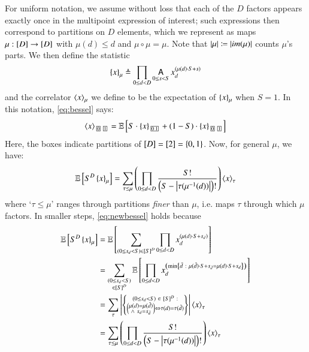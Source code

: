         For uniform notation, we assume without loss that each of the $D$
        factors appears exactly once in the multipoint expression of interest;
        such expressions then correspond to partitions on $D$ elements, which
        we represent as maps $\mu:\left[D\right]\to \left[D\right]$ with $\mu(d)\leq d$ and
        $\mu\circ \mu=\mu$.  Note that $\left|\mu\right| \coloneqq \left|im(\mu)\right|$
        counts $\mu$'s parts.  We then define the statistic
        $$
            \left\{x\right\}_\mu
            \triangleq
            \prod_{0\leq d<D} \operatorname*{\text{\sffamily A}}_{0\leq s<S} x_d^{(\mu(d)\cdot S + s)}
        $$
        and the correlator $\left\langle x\right\rangle_\mu$ we define to be the expectation of 
        $\left\{x\right\}_\mu$ when $S=1$.  In this notation, \ref{eq:bessel} says: 
        $$
            \wang{x}_{\partitionbox{0}\partitionbox{1}}
            =
            \expct{
                S       \cdot \wurl{x}_{\partitionbox{0 1}} +
                (1-S)   \cdot \wurl{x}_{\partitionbox{0}\partitionbox{1}}
            }
        $$
        Here, the boxes indicate partitions of $\left[D\right]=\left[2\right]=\{0,1\}$.
        Now, for general $\mu$, we have:
        \begin{equation} \label{eq:newbessel}
            \mathbb{E}\left[S^D \left\{x\right\}_\mu\right]
            =
            \sum_{\tau\leq \mu} \left(
                \prod_{0\leq d<D}
                    \frac{S!}{\left(S-\left|\tau(\mu^{-1}(d))\right|\right)!}
            \right)
            \left\langle x\right\rangle_\tau
        \end{equation}
        where `$\tau \leq \mu$' ranges through partitions \emph{finer} than 
        $\mu$, i.e. maps $\tau$ through which $\mu$ factors.   
        In smaller steps, \ref{eq:newbessel} holds because
        \begin{align*}
            \mathbb{E}\left[S^D \left\{x\right\}_\mu\right]
            &=
            \mathbb{E}\left[
                \sum_{(0\leq s_d<S) \in \left[S\right]^D}
                \prod_{0\leq d<D}
                x_d^{\left(\mu(d)\cdot S + s_d\right)}
            \right]\\
            &=
            \sum_{\substack{(0\leq s_d<S) \\ \in \left[S\right]^D}}
            \mathbb{E}\left[
                \prod_{0\leq d<D}
                x_d^{\left(\min \left\{
                    \tilde{d}~:~\mu(\tilde{d})\cdot S+s_{\tilde{d}} = \mu(d)\cdot S+s_d
                \right\}\right)}
            \right]\\
            &=
            \sum_{\tau} \left|\left\{\substack{
                (0\leq s_d<S)~\in~[S]^D~: \\
                \left(\substack{
                    \mu(d)=\mu(\tilde{d}) \\
                    \wedge~s_d=s_{\tilde{d}}
                }\right)
                \Leftrightarrow
                \tau(d)=\tau(\tilde{d})
            }\right\}\right|
            \left\langle x\right\rangle_\tau \\
            &=
            \sum_{\tau\leq \mu} \left(
                \prod_{0\leq d<D}
                    \frac{S!}{\left(S-\left|\tau(\mu^{-1}(d))\right|\right)!}
            \right)
            \left\langle x\right\rangle_\tau
        \end{align*}

